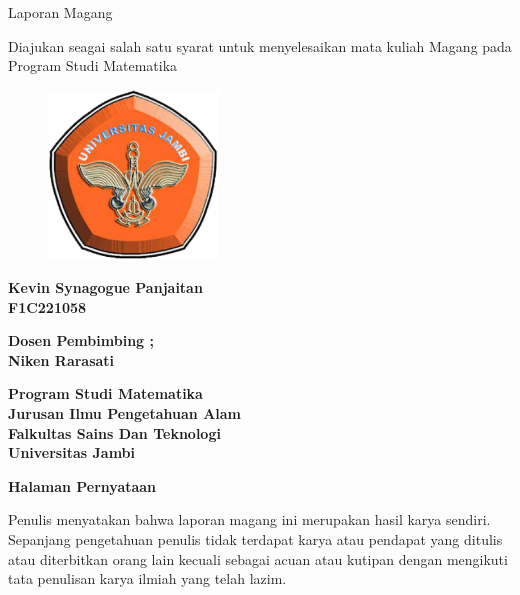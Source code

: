 \documentclass[12pt,calibri]{article}
\begin{document}
\begin{center}
    \large Laporan Magang

\end{center}
\begin{center}
    \small Diajukan seagai salah satu syarat untuk menyelesaikan mata kuliah Magang
    pada Program Studi Matematika

\end{center}
\vspace*{10pt} 

\begin{figure}[h]
    \centering
    \includegraphics[width=0.4\textwidth]{unja.png}
\end{figure}

\begin{center}
    {\bfseries  Kevin Synagogue Panjaitan} \\
    {\bfseries   F1C221058}
\end{center}
\vspace{10pt}
\begin{center}
    {\bfseries  Dosen Pembimbing ;} \\
    {\bfseries   Niken Rarasati }
\end{center}
\vspace{10pt}
\begin{center}
    {\bfseries \large Program Studi Matematika }\\
    {\bfseries \large Jurusan Ilmu Pengetahuan Alam}\\
    {\bfseries \large Falkultas Sains Dan Teknologi }\\
    {\bfseries \large Universitas Jambi}
\end{center}
\newpage

\begin{center}
    \bfseries\Large Halaman Pernyataan
\end{center}
\hspace*{1cm} Penulis menyatakan bahwa laporan magang ini merupakan hasil karya
sendiri. Sepanjang pengetahuan penulis tidak terdapat karya atau pendapat
yang ditulis atau diterbitkan orang lain kecuali sebagai acuan atau kutipan
dengan mengikuti tata penulisan karya ilmiah yang telah lazim.
\end{document}
